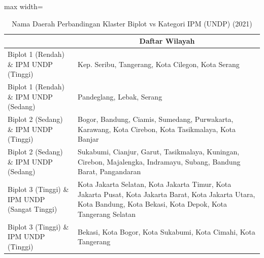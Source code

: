 \begin{table}[H]
\centering
\caption{Nama Daerah Perbandingan Klaster Biplot vs Kategori IPM (UNDP) (2021)} \label{tab:app2crossname2021}
\begin{adjustbox}{max width=\textwidth}
\begin{tabular}{|>{\centering\arraybackslash}p{4cm}|p{10cm}|}
\hline
\multicolumn{1}{|c|}{\textbf{Kategori}} & \multicolumn{1}{c|}{\textbf{Daftar Wilayah}} \\
\hline
Biplot 1 (Rendah) \& IPM UNDP (Tinggi) & Kep. Seribu, Tangerang, Kota Cilegon, Kota Serang \\
\hline
Biplot 1 (Rendah) \& IPM UNDP (Sedang) & Pandeglang, Lebak, Serang \\
\hline
Biplot 2 (Sedang) \& IPM UNDP (Tinggi) & Bogor, Bandung, Ciamis, Sumedang, Purwakarta, Karawang, Kota Cirebon, Kota Tasikmalaya, Kota Banjar \\
\hline
Biplot 2 (Sedang) \& IPM UNDP (Sedang) & Sukabumi, Cianjur, Garut, Tasikmalaya, Kuningan, Cirebon, Majalengka, Indramayu, Subang, Bandung Barat, Pangandaran \\
\hline
Biplot 3 (Tinggi) \& IPM UNDP (Sangat Tinggi) & Kota Jakarta Selatan, Kota Jakarta Timur, Kota Jakarta Pusat, Kota Jakarta Barat, Kota Jakarta Utara, Kota Bandung, Kota Bekasi, Kota Depok, Kota Tangerang Selatan \\
\hline
Biplot 3 (Tinggi) \& IPM UNDP (Tinggi) & Bekasi, Kota Bogor, Kota Sukabumi, Kota Cimahi, Kota Tangerang \\
\hline
\end{tabular}
\end{adjustbox}
\end{table}